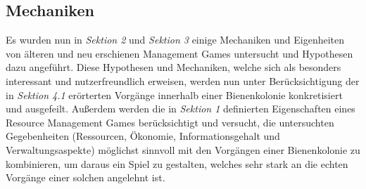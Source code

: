 \subsection{Mechaniken}
Es wurden nun in \textit{Sektion 2} und \textit{Sektion 3} einige Mechaniken und Eigenheiten von älteren und neu erschienen Management Games untersucht und Hypothesen dazu angeführt. Diese Hypothesen und Mechaniken, welche sich als besonders interessant und nutzerfreundlich erweisen, werden nun unter Berücksichtigung der in \textit{Sektion 4.1} erörterten Vorgänge innerhalb einer Bienenkolonie konkretisiert und ausgefeilt. Außerdem werden die in \textit{Sektion 1} definierten Eigenschaften eines Resource Management Games berücksichtigt und versucht, die untersuchten Gegebenheiten (Ressourcen, Ökonomie, Informationsgehalt und Verwaltungsaspekte) möglichst sinnvoll mit den Vorgängen einer Bienenkolonie zu kombinieren, um daraus ein Spiel zu gestalten, welches sehr stark an die echten Vorgänge einer solchen angelehnt ist. 